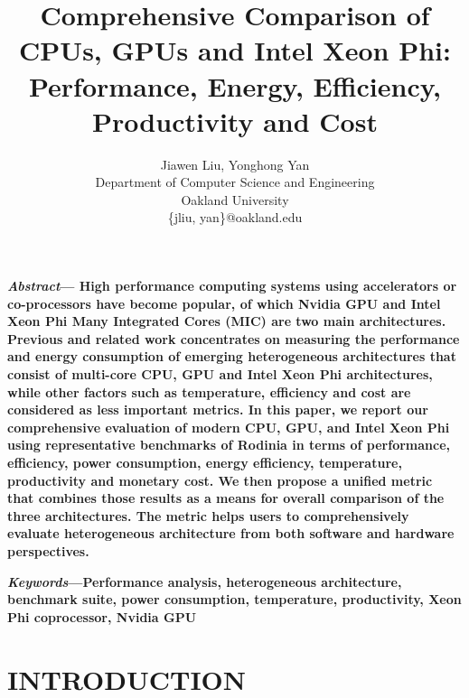 \documentclass[10pt,pageno]{jpaper}
\begin{document}
\title{
Comprehensive Comparison of CPUs, GPUs and Intel Xeon Phi: Performance, Energy, Efficiency, Productivity and Cost}

\author{Jiawen Liu, Yonghong Yan \\
Department of Computer Science and Engineering\\
Oakland University\\
\{jliu, yan\}@oakland.edu
}

\date{}

\maketitle

\thispagestyle{empty}
\begin{small}
 \textbf{\textit{Abstract}—
High performance computing systems using accelerators or co-processors have become popular, of which Nvidia GPU and 
Intel Xeon Phi Many Integrated Cores (MIC) are two main architectures.  
Previous and related work concentrates on measuring the performance and energy consumption of emerging 
heterogeneous architectures that consist of multi-core CPU, GPU and Intel Xeon Phi architectures,
while other factors such as temperature, efficiency and cost are considered as less important metrics.  
In this paper, we report our comprehensive evaluation of modern CPU, GPU, and Intel Xeon Phi using representative benchmarks of Rodinia
in terms of performance, efficiency, power consumption, energy efficiency, temperature, productivity and monetary cost. 
We then propose a unified metric that combines those results as a means for overall comparison of the three architectures. 
The metric helps users to comprehensively evaluate heterogeneous architecture from both software and hardware perspectives.}

\textbf{\textit{Keywords}—Performance analysis, heterogeneous architecture, benchmark suite, power consumption, temperature, productivity, Xeon Phi coprocessor, Nvidia GPU}

\end{small}

\section{INTRODUCTION}
\label{sec:INTRODUCTION}

\end{document}
